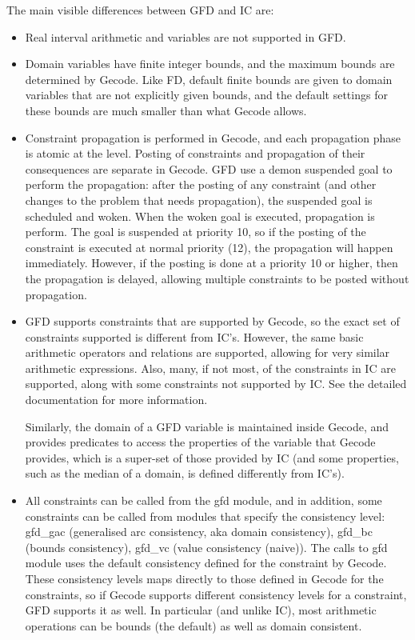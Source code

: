 The main visible differences between GFD and IC are:
\begin{itemize}
       \item Real interval arithmetic and variables are not supported in GFD.

       \item Domain variables have finite integer bounds, and the maximum 
       bounds are
       determined by Gecode. Like FD, default finite bounds are given to 
       domain variables that are not explicitly given bounds, and the default
       settings for these bounds are much smaller than what Gecode allows.

       \item Constraint propagation is performed in Gecode, and each propagation
       phase is atomic at the \eclipse level. Posting of constraints and 
       propagation of their consequences are separate in Gecode. GFD use a
       demon suspended goal to perform the propagation: after the posting
       of any constraint (and other changes to the problem that needs 
       propagation), the suspended goal is scheduled and woken. When the
       woken goal is executed, propagation is perform. The goal is suspended
       at priority 10, so if the posting of the constraint is executed at
       normal priority (12), the propagation will happen immediately. However,
       if the posting is done at a priority 10 or higher, then the propagation
       is delayed, allowing multiple constraints to be posted without
       propagation. 

       \item GFD supports constraints that are supported by Gecode,
       so the exact set of constraints supported is different from IC's. 
       However, the same basic arithmetic operators and relations are 
       supported, allowing for very similar arithmetic expressions. Also,
       many, if not most, of the constraints in IC are supported, along with
       some constraints not supported by IC. See the detailed documentation
       for more information.

       Similarly, the domain of a GFD variable is maintained inside Gecode,
       and provides predicates to access the properties of the variable that
       Gecode provides, which is a super-set of those provided by IC (and some 
       properties, such as the median of a domain, is defined differently from 
       IC's). 

       \item All constraints can be called from the gfd module, and in
       addition, some constraints can be called from modules that specify
       the consistency level: gfd_gac (generalised arc consistency, aka
       domain consistency), gfd_bc (bounds consistency), gfd_vc (value
       consistency (naive)). The calls to gfd module uses the default consistency 
       defined for the constraint by Gecode. These consistency levels maps 
       directly to those defined in Gecode for the constraints, so if Gecode supports 
       different consistency levels for a constraint, GFD supports it as 
       well. In  particular (and unlike IC), most arithmetic operations can 
       be bounds (the default) as well as domain consistent.


\end{itemize}
